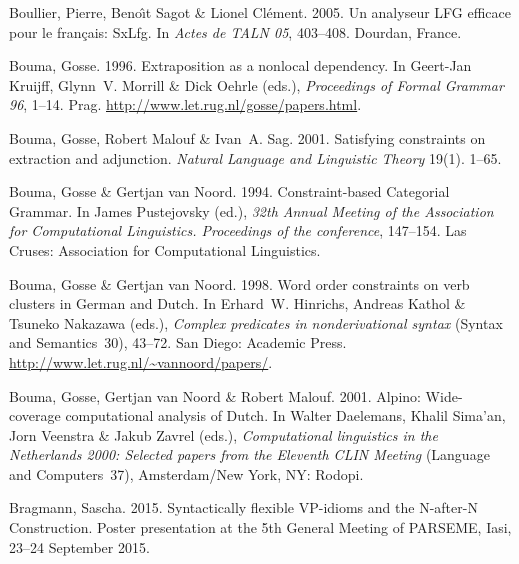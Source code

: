 \begin{thebibliography}{1420}
Boullier, Pierre, Beno{\^\i}t Sagot \& Lionel Cl{\'e}ment. 2005.
\newblock Un analyseur {LFG} efficace pour le fran{\c c}ais: {SxLfg}.
\newblock In \emph{{Actes de TALN 05}}, 403--408. Dourdan, France.

Bouma, Gosse. 1996.
\newblock Extraposition as a nonlocal dependency.
\newblock In Geert-Jan Kruijff, Glynn~V. Morrill \& Dick Oehrle (eds.),
  \emph{Proceedings of {Formal Grammar 96}}, 1--14. Prag.
\newblock \urlprefix\url{http://www.let.rug.nl/gosse/papers.html}.

Bouma, Gosse, Robert Malouf \& Ivan~A. Sag. 2001{}.
\newblock Satisfying constraints on extraction and adjunction.
\newblock \emph{Natural Language and Linguistic Theory} 19(1). 1--65.

Bouma, Gosse \& Gertjan van Noord. 1994.
\newblock Constraint-based {Categorial Grammar}.
\newblock In James Pustejovsky (ed.), \emph{32th {Annual Meeting of the
  Association for Computational Linguistics. Proceedings} of the conference},
  147--154. Las Cruses: Association for Computational Linguistics.

Bouma, Gosse \& Gertjan van Noord. 1998.
\newblock Word order constraints on verb clusters in {German} and {Dutch}.
\newblock In Erhard~W. Hinrichs, Andreas Kathol \& Tsuneko Nakazawa (eds.),
  \emph{Complex predicates in nonderivational syntax} (Syntax and
  Semantics~30), 43--72. San Diego: Academic Press.
\newblock \urlprefix\url{http://www.let.rug.nl/~vannoord/papers/}.

Bouma, Gosse, Gertjan van Noord \& Robert Malouf. 2001{}.
\newblock Alpino: Wide-coverage computational analysis of {Dutch}.
\newblock In Walter Daelemans, Khalil Sima'an, Jorn Veenstra \& Jakub Zavrel
  (eds.), \emph{Computational linguistics in the {Netherlands} 2000: {Selected}
  papers from the {Eleventh CLIN Meeting}} (Language and Computers~37),
  Amsterdam/New York, NY: Rodopi.

Bragmann, Sascha. 2015.
\newblock Syntactically flexible {VP}-idioms and the {N-after-N Construction}.
\newblock Poster presentation at the 5th General Meeting of {PARSEME}, {Iasi},
  23--24 {September} 2015.


\end{thebibliography}
